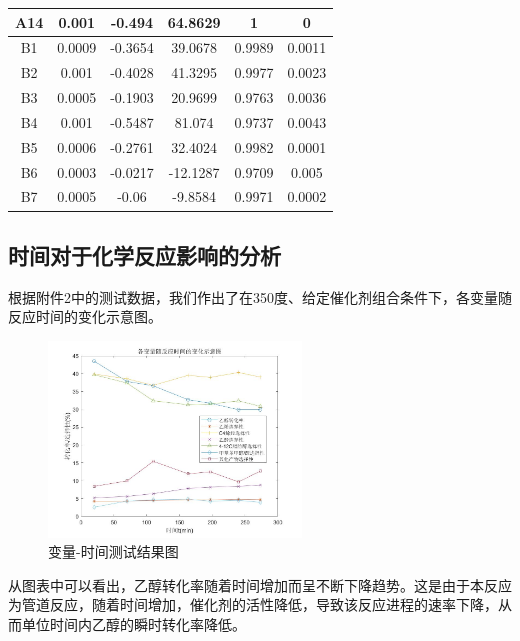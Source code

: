 \documentclass{article}
\begin{document}
\begin{table}[!h]
\begin{tabular}{|c|c|c|c|c|c|}
			A14                        & 0.001   & -0.494  & 64.8629   & 1                        & 0       \\ \hline
			B1                         & 0.0009  & -0.3654 & 39.0678   & 0.9989                   & 0.0011  \\ \hline
			B2                         & 0.001   & -0.4028 & 41.3295   & 0.9977                   & 0.0023  \\ \hline
			B3                         & 0.0005  & -0.1903 & 20.9699   & 0.9763                   & 0.0036  \\ \hline
			B4                         & 0.001   & -0.5487 & 81.074    & 0.9737                   & 0.0043  \\ \hline
			B5                         & 0.0006  & -0.2761 & 32.4024   & 0.9982                   & 0.0001  \\ \hline
			B6                         & 0.0003  & -0.0217 & -12.1287  & 0.9709                   & 0.005   \\ \hline
			B7                         & 0.0005  & -0.06   & -9.8584   & 0.9971                   & 0.0002  \\ \hline
		\end{tabular}
	\end{table}


	\newpage
	\subsection{时间对于化学反应影响的分析}
	根据附件2中的测试数据，我们作出了在350度、给定催化剂组合条件下，各变量随反应时间的变化示意图。
	\begin{figure}[!h]
		\centering 
		\includegraphics[width=0.6\textwidth]{timefigure.jpg}
		\caption{变量-时间测试结果图}
	\end{figure}
	
	从图表中可以看出，乙醇转化率随着时间增加而呈不断下降趋势。这是由于本反应为管道反应，随着时间增加，催化剂的活性降低，导致该反应进程的速率下降，从而单位时间内乙醇的瞬时转化率降低。
	
\end{document}
